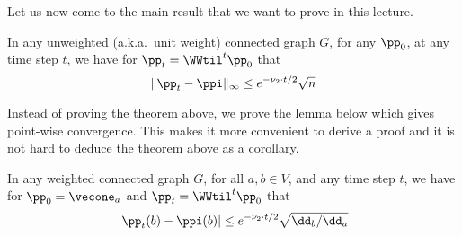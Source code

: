 Let us now come to the main result that we want to prove in this lecture. 

\begin{theorem}
In any unweighted (a.k.a.\ unit weight) connected graph $G$, for any $\pp_0$, at any time step $t$, we have for $\pp_t = \WWtil^t \pp_0$ that
\[
\| \pp_t - \ppi \|_{\infty}  \leq e^{-\nu_2 \cdot t/2} \sqrt{n} 
\]
\end{theorem}

Instead of proving the theorem above, we prove the lemma below which gives point-wise convergence. This makes it more convenient to derive a proof and it is not hard to deduce the theorem above as a corollary.

\begin{lemma}
  In any weighted connected graph $G$, for all $a,b \in V$, and any time step $t$, we have for $\pp_0 = \vecone_a$ and $\pp_t = \WWtil^t \pp_0$ that
\[
  |\pp_t(b) - \ppi(b)| \leq e^{-\nu_2 \cdot t/2} \sqrt{\dd_b/\dd_a} 
\]
\end{lemma}

